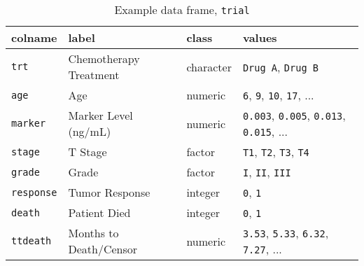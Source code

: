 \captionsetup[table]{labelformat=empty,skip=1pt}
\begin{longtable}{llll}
\caption{\label{tab:}Example data frame, \texttt{trial}}\\
\toprule
colname & label & class & values \\ 
\midrule
\texttt{trt} & Chemotherapy Treatment & character & \texttt{Drug A}, \texttt{Drug B} \\ 
\texttt{age} & Age & numeric & \texttt{6}, \texttt{9}, \texttt{10}, \texttt{17}, ... \\ 
\texttt{marker} & Marker Level (ng/mL) & numeric & \texttt{0.003}, \texttt{0.005}, \texttt{0.013}, \texttt{0.015}, ... \\ 
\texttt{stage} & T Stage & factor & \texttt{T1}, \texttt{T2}, \texttt{T3}, \texttt{T4} \\ 
\texttt{grade} & Grade & factor & \texttt{I}, \texttt{II}, \texttt{III} \\ 
\texttt{response} & Tumor Response & integer & \texttt{0}, \texttt{1} \\ 
\texttt{death} & Patient Died & integer & \texttt{0}, \texttt{1} \\ 
\texttt{ttdeath} & Months to Death/Censor & numeric & \texttt{3.53}, \texttt{5.33}, \texttt{6.32}, \texttt{7.27}, ... \\ 
\bottomrule
\end{longtable}

